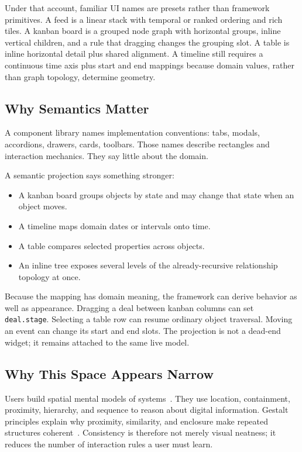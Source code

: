 \documentclass[sigplan,review,anonymous,10pt]{acmart}
\begin{document}
Under that account, familiar UI names are presets rather than framework primitives. A feed is a linear stack with temporal or ranked ordering and rich tiles. A kanban board is a grouped node graph with horizontal groups, inline vertical children, and a rule that dragging changes the grouping slot. A table is inline horizontal detail plus shared alignment. A timeline still requires a continuous time axis plus start and end mappings because domain values, rather than graph topology, determine geometry.

\subsection{Why Semantics Matter}

A component library names implementation conventions: tabs, modals, accordions, drawers, cards, toolbars. Those names describe rectangles and interaction mechanics. They say little about the domain.

A semantic projection says something stronger:

\begin{itemize}
\item A kanban board groups objects by state and may change that state when an object moves.
\item A timeline maps domain dates or intervals onto time.
\item A table compares selected properties across objects.
\item An inline tree exposes several levels of the already-recursive relationship topology at once.
\end{itemize}

Because the mapping has domain meaning, the framework can derive behavior as well as appearance. Dragging a deal between kanban columns can set \texttt{deal.stage}. Selecting a table row can resume ordinary object traversal. Moving an event can change its start and end slots. The projection is not a dead-end widget; it remains attached to the same live model.

\subsection{Why This Space Appears Narrow}

Users build spatial mental models of systems~\cite{norman1988,gentnerStevens1983}. They use location, containment, proximity, hierarchy, and sequence to reason about digital information. Gestalt principles explain why proximity, similarity, and enclosure make repeated structures coherent~\cite{wertheimer1923,koffka1935}. Consistency is therefore not merely visual neatness; it reduces the number of interaction rules a user must learn.
\end{document}
